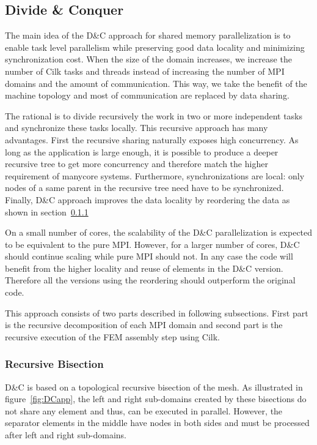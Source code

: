 \documentclass{IOS-Book-Article}
\begin{document}
\subsection{Divide \& Conquer}

The main idea of the D\&C approach for shared memory parallelization is to enable task level parallelism while preserving good data locality and minimizing synchronization cost.
When the size of the domain increases, we increase the number of Cilk tasks and threads instead of increasing the number of MPI domains and the amount of communication.
This way, we take the benefit of the machine topology and most of communication are replaced by data sharing.

The rational is to divide recursively the work in two or more independent tasks and synchronize these tasks locally. This recursive approach has many advantages.
First the recursive sharing naturally exposes high concurrency. As long as the application is large enough, it is possible to produce a deeper recursive tree to get more concurrency and 
therefore match the higher requirement of manycore systems. Furthermore, synchronizations are local: only nodes of a same parent in the recursive tree need have to be synchronized.
Finally, D\&C approach improves the data locality by reordering the data as shown in section~\ref{sec:DCrec} 

On a small number of cores, the scalability of the D\&C parallelization is expected to be equivalent to the pure MPI.
However, for a larger number of cores, D\&C should continue scaling while pure MPI should not.
In any case the code will benefit from the higher locality and reuse of elements in the D\&C version. Therefore all the versions using the reordering should outperform the original code.

This approach consists of two parts described in following subsections.
First part is the recursive decomposition of each MPI domain and second part is the recursive execution of the FEM assembly step using Cilk.

\subsubsection{Recursive Bisection}
\label{sec:DCrec}
D\&C is based on a topological recursive bisection of the mesh.
As illustrated in figure~\ref{fig:DCapp}, the left and right sub-domains created by these bisections do not share any element and thus, can be executed in parallel.
However, the separator elements in the middle have nodes in both sides and must be processed after left and right sub-domains.
\end{document}
